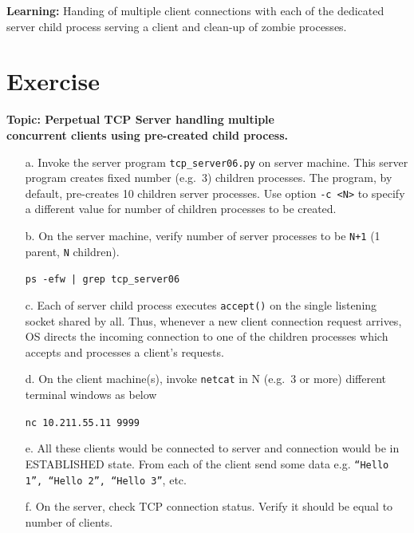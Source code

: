 \begin{multicols}{2}
\begin{itemize}
\end{itemize}

\textbf{Learning:} Handing of multiple client connections with each of the dedicated server child process serving a client and clean-up of zombie processes.

\section*{Exercise \label{chap1-exe04}}

\textbf{Topic:  Perpetual TCP Server handling multiple\\ concurrent clients using pre-created child process.}

\begin{itemize}

\item[a.] Invoke the server program \texttt{tcp\_server06.py} on server machine. This server program creates fixed number (e.g.~3) children processes. The program, by default, pre-creates 10 children server processes. Use option \texttt{-c <N>} to specify a different value for number of children processes to be created.

\item[b.] On the server machine, verify number of server processes to be \texttt{N+1} (1 parent, \texttt{N} children).

\texttt{ps -efw | grep tcp\_server06}

\item[c.] Each of server child process executes \texttt{accept()} on the single listening socket shared by all. Thus, whenever a new client connection request arrives, OS directs the incoming connection to one of the children processes which accepts and processes a client’s requests.

\item[d.] On the client machine(s), invoke \texttt{netcat} in N (e.g.~3 or more) different terminal windows as below

\texttt{nc 10.211.55.11 9999}

\item[e.] All these clients would be connected to server and connection would be in ESTABLISHED state. From each of the client send some data e.g. \texttt{“Hello 1”, “Hello 2”, “Hello 3”}, etc.

\item[f.] On the server, check TCP connection status.  Verify it should be equal to number of clients.


\end{itemize}
\end{multicols}
